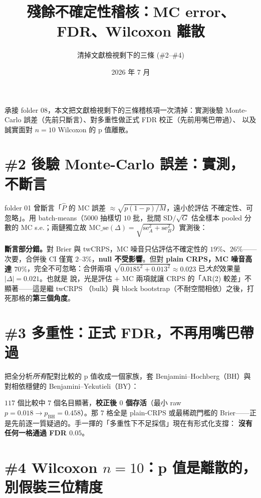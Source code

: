 \documentclass[12pt]{article}
\title{\textbf{殘餘不確定性稽核：MC error、FDR、Wilcoxon 離散}}
\author{清掉文獻檢視剩下的三條 (\#2--\#4)}
\date{2026 年 7 月}
\begin{document}
\maketitle

\noindent 承接 folder 08，本文把文獻檢視剩下的三條稽核項一次清掉：實測後驗
Monte-Carlo 誤差（先前只斷言）、對多重性做正式 FDR 校正（先前用嘴巴帶過）、
以及誠實面對 $n=10$ Wilcoxon 的 p 值離散。

\section*{\#2 後驗 Monte-Carlo 誤差：實測，不斷言}

folder 01 曾斷言「$\widehat P$ 的 MC 誤差 $\approx\sqrt{p(1-p)/M}$，遠小於評估
不確定性、可忽略」。用 batch-means（$5000$ 抽樣切 $10$ 批，批間 SD$/\sqrt{G}$
估全樣本 pooled 分數的 MC s.e.；兩鏈獨立故
$\mathrm{MC\_se}(\Delta)=\sqrt{\mathrm{se}_A^2+\mathrm{se}_B^2}$）實測後：



\noindent\textbf{斷言部分錯。}對 Brier 與 twCRPS，MC 噪音只佔評估不確定性的
$19\%$、$26\%$——次要，合併後 CI 僅寬 $2$--$3\%$，\textbf{null 不受影響}。但對
\textbf{plain CRPS，MC 噪音高達 $70\%$}，完全不可忽略：合併兩項
$\sqrt{0.0185^2+0.013^2}\approx0.023$ 已\emph{大於}效果量 $|\Delta|=0.021$。也就是
說，光是評估 $+$ MC 兩項就讓 CRPS 的「AR(2) 較差」不顯著——這是繼 twCRPS
（bulk）與 block bootstrap（不耐空間相依）之後，打死那格的\textbf{第三個角度}。

\section*{\#3 多重性：正式 FDR，不再用嘴巴帶過}

把全分析\emph{所有}配對比較的 p 值收成一個家族，套 Benjamini--Hochberg（BH）與
對相依穩健的 Benjamini--Yekutieli（BY）：



\noindent$117$ 個比較中 $7$ 個名目顯著，\textbf{校正後 $0$ 個存活}（最小 raw
$p=0.018\to p_{\mathrm{BH}}=0.458$）。那 $7$ 格全是 plain-CRPS 或最稀疏門檻的
Brier——正是先前逐一質疑過的。手一揮的「多重性下不足採信」現在有形式化支撐：
\textbf{沒有任何一格通過 FDR $0.05$}。

\section*{\#4 Wilcoxon $n=10$：p 值是離散的，別假裝三位精度}
\end{document}
